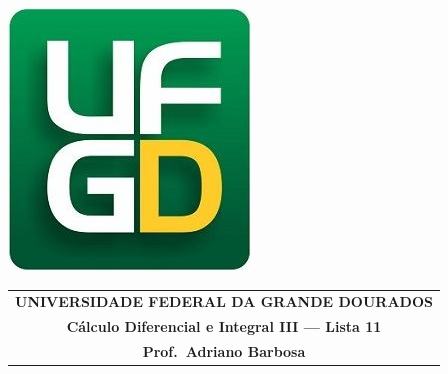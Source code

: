 \documentclass[a4paper,5pt]{amsbook}
\begin{document}
\thispagestyle{empty}
\pagestyle{empty}
\begin{minipage}[h]{0.14\textwidth}
	\includegraphics[scale=0.24]{../../ufgd.png}
\end{minipage}
\begin{minipage}[h]{\textwidth}
\begin{tabular}{c}
{{\bf UNIVERSIDADE FEDERAL DA GRANDE DOURADOS}}\\
{{\bf C\'alculo Diferencial e Integral III --- Lista 11}}\\
{{\bf Prof.\ Adriano Barbosa}}\\
\end{tabular}
\vspace{-0.45cm}
%
\end{minipage}

\end{document}
